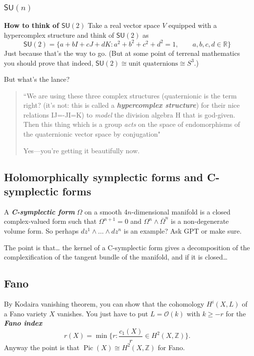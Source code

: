 \subsubsection{\(\mathsf{SU}(n)\)}

\textbf{How to think of \(\mathsf{SU}(2)\)} Take a real vector space \(V\) equipped with a hypercomplex structure and think of \(\mathsf{SU}(2)\) as
\[\mathsf{SU}(2)=\{a+b I+c J+ d K: a^2+b^2+c^2+d^2=1,\qquad a,b,c,d \in \mathbb{R} \}\]
Just because that's the way to go. (But at some point of terrenal mathematics you should prove that indeed, \(\mathsf{SU}(2)\cong \text{unit quaternions} \cong S^3\).)

But what's the lance?
\begin{quotation}
	``We are using these three complex structures (quaternionic is the term right? (it's not: this is called a \textit{\textbf{hypercomplex structure}}) for their nice relations IJ=-JI=K) to \textit{model} the division algebra H that is god-given. Then this thing which is a group \textit{acts} on the space of endomorphisms of the quaternionic vector space by conjugation"

	\vspace{1em}
	\hfill Yes---you're getting it beautifully now.
\end{quotation}

\subsection{Holomorphically symplectic forms and C-symplectic forms}

A \textit{\textbf{C-symplectic form}} \(\Omega\) on a smooth 4\(n\)-dimensional manifold is a closed complex-valued form such that \(\Omega^{n+1}=0\) and \(\Omega^n \wedge \overline{ \Omega}^n\) is a non-degenerate volume form. So perhaps \(dz^1 \wedge \ldots \wedge dz^n\) is an example? Ask GPT or make sure.

The point is that… the kernel of a C-symplectic form gives a decomposition of the complexification of the tangent bundle of the manifold, and if it is closed…



\subsection{Fano}

\begin{exercise}\leavevmode
By Kodaira vanishing theorem, you can show that the cohomology \(H^{i}(X,L)\) of a Fano variety \(X\) vanishes. You just have to put \(L=\mathcal{O}(k)\) with \(k\geq  -r\) for the \textit{\textbf{Fano index}} 
\[r(X)=\operatorname{min}\{r:\frac{c_1(X)}{r}\in H^{2}(X,\mathbb{Z})\}.\]
Anyway the point is that \(\operatorname{Pic}(X)\cong H^{2}(X,\mathbb{Z})\) for Fano.
\end{exercise}

